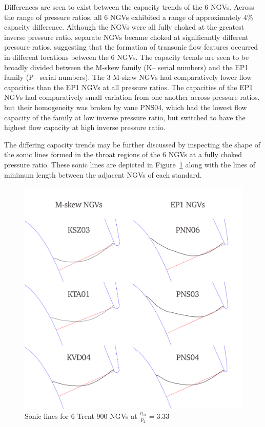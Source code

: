 \documentclass[a4paper, 11pt, oneside]{report}
\begin{document}
Differences are seen to exist between the capacity trends of the 6 NGVs. Across the range of pressure ratios, all 6 NGVs exhibited a range of approximately 4\% capacity difference. Although the NGVs were all fully choked at the greatest inverse pressure ratio, separate NGVs became choked at significantly different pressure ratios, suggesting that the formation of transonic flow features occurred in different locations between the 6 NGVs. The capacity trends are seen to be broadly divided between the M-skew family (K-- serial numbers) and the EP1 family (P-- serial numbers). The 3 M-skew NGVs had comparatively lower flow capacities than the EP1 NGVs at all pressure ratios. The capacities of the EP1 NGVs had comparatively small variation from one another across pressure ratios, but their homogeneity was broken by vane PNS04, which had the lowest flow capacity of the family at low inverse pressure ratio, but switched to have the highest flow capacity at high inverse pressure ratio.

The differing capacity trends may be further discussed by inspecting the shape of the sonic lines formed in the throat regions of the 6 NGVs at a fully choked pressure ratio. These sonic lines are depicted in Figure~\ref{fig:T900_mach1_lines} along with the lines of minimum length between the adjacent NGVs of each standard. 

\begin{figure}[H]
      \centering
      \includegraphics[width=.7\textwidth]{figs/T900_mach1_lines.png}
      \caption{Sonic lines for 6 Trent 900 NGVs at $\frac{p_{01}}{p_2}=3.33$}
      \label{fig:T900_mach1_lines}
\end{figure}
\end{document}
